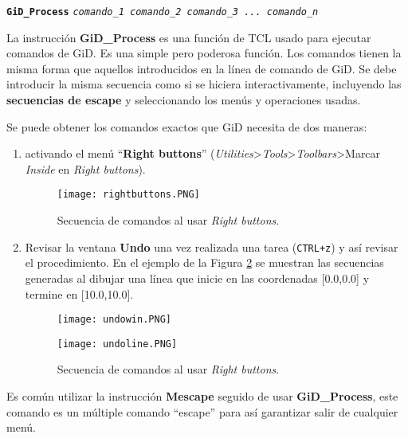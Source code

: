 \documentclass[10pt, a4paper, twocolumn]{article} %
\begin{document}
\vspace{0.20cm}
\begin{center}
	\textbf{\texttt{GiD\_Process}} \texttt{\textit{comando\_1 comando\_2 comando\_3 ... comando\_n}}
\end{center}
\vspace{0.20cm}


La instrucción \textbf{GiD\_Process} es una función de TCL usado para ejecutar comandos de GiD. Es una simple pero poderosa función. Los comandos tienen la misma forma que aquellos introducidos en la línea de comando de GiD. Se debe introducir la misma secuencia como si se hiciera interactivamente, incluyendo las \textbf{secuencias de escape} y seleccionando los menús y operaciones usadas.

Se puede obtener los comandos exactos que GiD necesita de dos maneras:

\begin{enumerate}
	\item activando el menú ``\textbf{Right buttons}'' (\textit{Utilities}>\textit{Tools}>\textit{Toolbars}>Marcar \textit{Inside} en \textit{Right buttons}).	
	\begin{figure}[hbtp!]\label{fig:rightbuttons}
	\centering
	\texttt{[image: rightbuttons.PNG]}
	\caption{Secuencia de comandos al usar \textit{Right buttons}.}
\end{figure}
	\item Revisar la ventana \textbf{Undo} una vez realizada una tarea (\texttt{CTRL+z}) y así revisar el procedimiento. En el ejemplo de la Figura \ref{fig:undo} se muestran las secuencias generadas al dibujar una línea que inicie en las coordenadas [0.0,0.0] y termine en [10.0,10.0].
	\begin{figure}[hbtp!]\label{fig:undo}
	\centering
	\begin{minipage}[t]{0.2\textwidth}
	\texttt{[image: undowin.PNG]}
	\end{minipage}
	\begin{minipage}[t]{0.16\textwidth}
	\texttt{[image: undoline.PNG]}
	\end{minipage}
	\caption{Secuencia de comandos al usar \textit{Right buttons}.}
\end{figure}
	
\end{enumerate}

Es común utilizar la instrucción \textbf{Mescape} seguido de usar \textbf{GiD\_Process}, este comando es un múltiple comando ``escape'' para así garantizar salir de cualquier menú.
\end{document}
